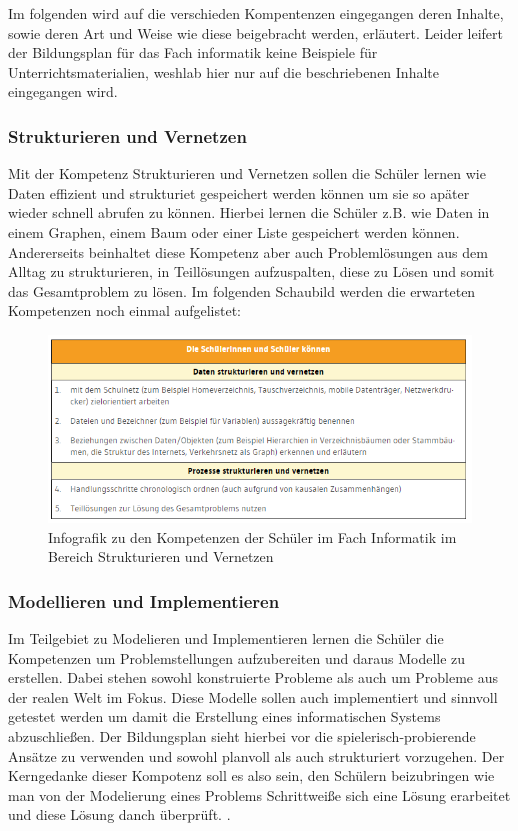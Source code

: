 Im folgenden wird auf die verschieden Kompentenzen eingegangen deren Inhalte, sowie deren Art und Weise wie diese beigebracht werden, erläutert. Leider leifert der Bildungsplan für das Fach informatik keine Beispiele für Unterrichtsmaterialien, weshlab hier nur auf die beschriebenen Inhalte eingegangen wird.

\subsubsection{Strukturieren und Vernetzen}
Mit der Kompetenz Strukturieren und Vernetzen sollen die Schüler lernen wie Daten effizient und strukturiet gespeichert werden können um sie so apäter wieder schnell abrufen zu können. Hierbei lernen die Schüler z.B. wie Daten in einem Graphen, einem Baum oder einer Liste gespeichert werden können. Andererseits beinhaltet diese Kompetenz aber auch Problemlösungen aus dem Alltag zu strukturieren, in Teillösungen aufzuspalten, diese zu Lösen und somit das Gesamtproblem zu lösen.\cite{StruktVer} Im folgenden Schaubild werden die erwarteten Kompetenzen noch einmal aufgelistet:


\begin{figure}[H]
	\centering
	\includegraphics[width=\textwidth,height=\textheight,keepaspectratio]{images/struc.png}
	\caption{Infografik zu den Kompetenzen der Schüler im Fach Informatik im Bereich Strukturieren und Vernetzen}
	\label{Strukturieren und Vernetzen Infografik}
\end{figure}

\subsubsection{Modellieren und Implementieren}

Im Teilgebiet zu Modelieren und Implementieren lernen die Schüler die Kompetenzen um Problemstellungen aufzubereiten und daraus Modelle zu erstellen. Dabei stehen sowohl konstruierte Probleme als auch um Probleme aus der realen Welt im Fokus. Diese Modelle sollen auch implementiert und sinnvoll getestet werden um damit die Erstellung eines informatischen Systems abzuschließen. Der Bildungsplan sieht hierbei vor die spielerisch-probierende Ansätze zu verwenden und sowohl planvoll als auch strukturiert vorzugehen. Der Kerngedanke dieser Kompotenz soll es also sein, den Schülern beizubringen wie man von der Modelierung eines Problems Schrittweiße sich eine Lösung erarbeitet und diese Lösung danch überprüft. \cite{Model}.

